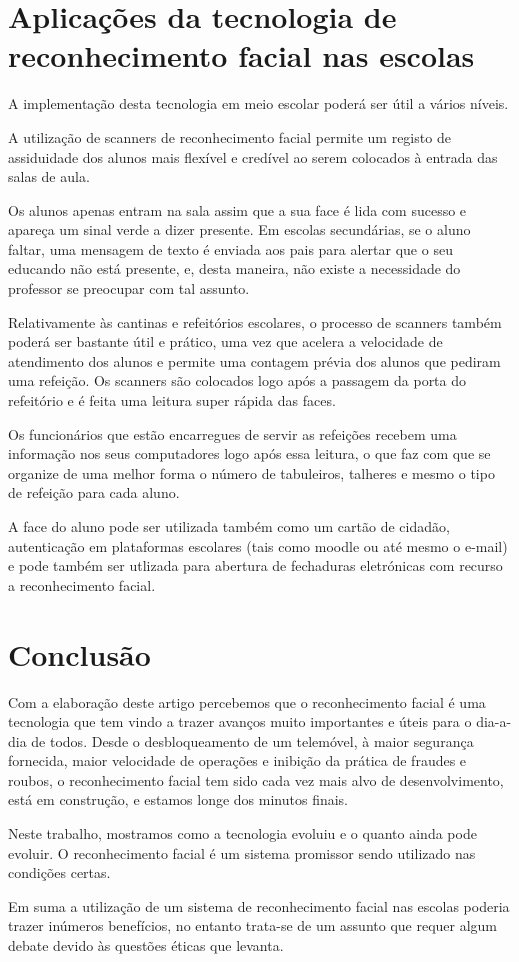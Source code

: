 \documentclass{article}
\begin{document}
  

\section{Aplicações da tecnologia de reconhecimento facial nas escolas} 

A implementação desta tecnologia em meio escolar poderá ser útil a vários níveis.

A utilização de scanners de reconhecimento facial permite um registo de assiduidade dos alunos mais flexível e
credível ao serem colocados à entrada das salas de aula.

Os alunos apenas entram na sala assim que a sua face é lida com sucesso e apareça um sinal verde a dizer presente.
Em escolas secundárias, se o aluno faltar, uma mensagem de texto é enviada aos pais para alertar que o seu educando
não está presente, e, desta maneira, não existe a necessidade do professor se preocupar com tal assunto.

Relativamente às cantinas e refeitórios escolares, o processo de scanners também poderá ser bastante útil e prático,
uma vez que acelera a velocidade de atendimento dos alunos e permite uma contagem prévia dos alunos que pediram uma refeição.
Os scanners são colocados logo após a passagem da porta do refeitório e é feita uma leitura super rápida das faces.

Os funcionários que estão encarregues de servir as refeições recebem uma informação nos seus computadores logo após essa leitura,
o que faz com que se organize de uma melhor forma o número de tabuleiros, talheres e mesmo o tipo de refeição para cada aluno.

A face do aluno pode ser utilizada também como um cartão de cidadão, autenticação
em plataformas escolares (tais como moodle ou até mesmo o e-mail) e pode também ser utlizada para
abertura de fechaduras eletrónicas com recurso a reconhecimento facial.\cite{c} \cite{f} \cite{i} \cite{j} 

  

\section{Conclusão} 

Com a elaboração deste artigo percebemos que o reconhecimento facial é uma tecnologia que tem vindo a trazer avanços muito importantes e úteis para o dia-a-dia de todos. Desde o desbloqueamento de um telemóvel, à maior segurança fornecida, maior velocidade de operações e inibição da prática de fraudes e roubos, o reconhecimento facial tem sido cada vez mais alvo de desenvolvimento, está em construção, e estamos longe dos minutos finais. 

Neste trabalho, mostramos como a tecnologia evoluiu e o quanto ainda pode evoluir. O reconhecimento facial é um sistema promissor sendo utilizado nas condições certas. 

Em suma a utilização de um sistema de reconhecimento facial nas escolas poderia trazer inúmeros benefícios, no entanto trata-se de um assunto que requer algum debate devido às questões éticas que levanta. 


 

 

  
\end{document}
